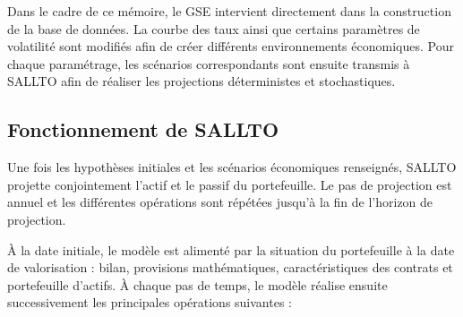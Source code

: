 Dans le cadre de ce mémoire, le GSE intervient directement dans la construction de la base de données. La courbe des taux ainsi que certains paramètres de volatilité sont modifiés afin de créer différents environnements économiques. Pour chaque paramétrage, les scénarios correspondants sont ensuite transmis à SALLTO afin de réaliser les projections déterministes et stochastiques.


\subsection{Fonctionnement de SALLTO}

Une fois les hypothèses initiales et les scénarios économiques renseignés, SALLTO projette conjointement l'actif et le passif du portefeuille. Le pas de projection est annuel et les différentes opérations sont répétées jusqu'à la fin de l'horizon de projection.

À la date initiale, le modèle est alimenté par la situation du portefeuille à la date de valorisation : bilan, provisions mathématiques, caractéristiques des contrats et portefeuille d'actifs. À chaque pas de temps, le modèle réalise ensuite successivement les principales opérations suivantes :


